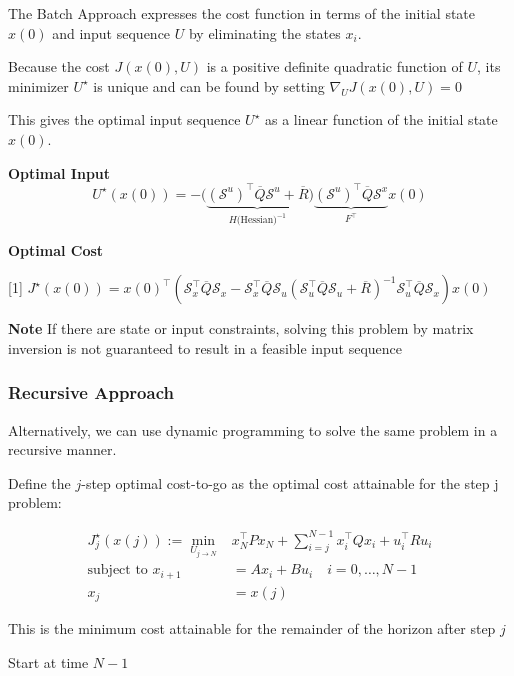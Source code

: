 The Batch Approach expresses the cost function in terms of
the initial state $x(0)$ and input sequence $U$
by eliminating the states $x_i$.

Because the cost $J(x(0), U)$ is a
positive definite quadratic function of $U$,
its minimizer $U^\star$ is unique and can be found
by setting $\nabla_U J(x(0), U) = 0$

This gives the optimal input sequence $U^\star$
as a linear function of the initial state $x(0)$.

\textbf{Optimal Input}
\[
	U^\star(x(0)) =
	- \bigl(
	\underbrace{
			(\mathcal{S}^u)^\top \overline{Q} \mathcal{S}^u + \overline{R}
		}_{H\text{(Hessian)}^{-1}}
	\bigr)
	\underbrace{
		(\mathcal{S}^u)^\top \overline{Q}\mathcal{S}^x
	}_ {F^\top}
	x(0)
\]

\textbf{Optimal Cost}

\scalebox{0.97}[1]{
	$\scriptstyle
		J^\star(x(0)) = x(0)^\top (
		\mathcal{S}_x^\top \overline{Q} \mathcal{S}_x
		- \mathcal{S}_x^\top \overline{Q} \mathcal{S}_u
		(\mathcal{S}_u^\top \overline{Q} \mathcal{S}_u
		+ \overline{R})^{-1}
		\mathcal{S}_u^\top \overline{Q} \mathcal{S}_x
		)x(0)$
}

\textbf{Note} If there are state or input constraints,
solving this problem by matrix inversion
is not guaranteed to result in a feasible input sequence

\subsubsection{Recursive Approach}

Alternatively, we can use dynamic programming
to solve the same problem in a recursive manner.

Define the $j$-step optimal cost-to-go as the
optimal cost attainable for the step j problem:

\[\begin{aligned}
		J_j^\star(x(j)) :=
		\min_{U_{j\to N}} & x_N^\top P x_N \!+
		\sum_{i=j}^{N-1}x_i^\top Q x_i + u_i^\top R u_i
		\\
		\text{subject to  }
		x_{i+1}           & = Ax_i+Bu_i
		\quad i  = 0,\dots,N-1
		\\
		x_j               & = x(j)
	\end{aligned}\]

This is the minimum cost attainable for the remainder
of the horizon after step $j$

Start at time $N-1$


